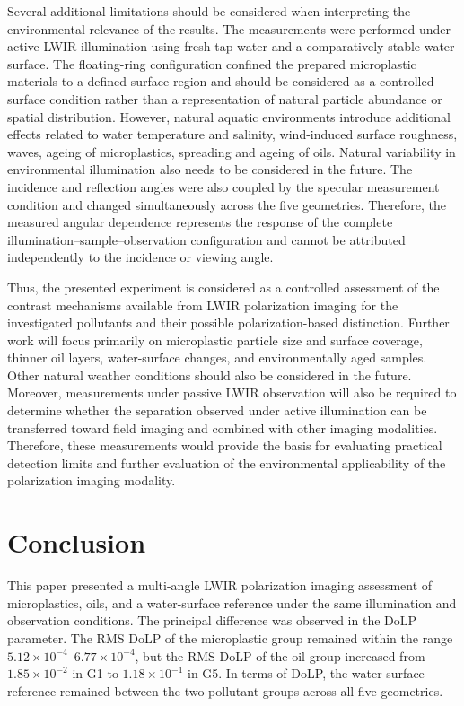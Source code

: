 \documentclass[pdflatex,sn-apa]{sn-jnl}
\begin{document}
Several additional limitations should be considered when interpreting the environmental relevance of the results. The measurements were performed under active LWIR illumination using fresh tap water and a comparatively stable water surface. The floating-ring configuration confined the prepared microplastic materials to a defined surface region and should be considered as a controlled surface condition rather than a representation of natural particle abundance or spatial distribution. However, natural aquatic environments introduce additional effects related to water temperature and salinity, wind-induced surface roughness, waves, ageing of microplastics, spreading and ageing of oils. Natural variability in environmental illumination also needs to be considered in the future. The incidence and reflection angles were also coupled by the specular measurement condition and changed simultaneously across the five geometries. Therefore, the measured angular dependence represents the response of the complete illumination--sample--observation configuration and cannot be attributed independently to the incidence or viewing angle.

Thus, the presented experiment is considered as a controlled assessment of the contrast mechanisms available from LWIR polarization imaging for the investigated pollutants and their possible polarization-based distinction. Further work will focus primarily on microplastic particle size and surface coverage, thinner oil layers, water-surface changes, and environmentally aged samples. Other natural weather conditions should also be considered in the future. Moreover, measurements under passive LWIR observation will also be required to determine whether the separation observed under active illumination can be transferred toward field imaging and combined with other imaging modalities. Therefore, these measurements would provide the basis for evaluating practical detection limits and further evaluation of the environmental applicability of the polarization imaging modality.

\section{Conclusion}

This paper presented a multi-angle LWIR polarization imaging assessment of microplastics, oils, and a water-surface reference under the same illumination and observation conditions. The principal difference was observed in the DoLP parameter. The RMS DoLP of the microplastic group remained within the range $5.12\times10^{-4}$--$6.77\times10^{-4}$, but the RMS DoLP of the oil group increased from $1.85\times10^{-2}$ in G1 to $1.18\times10^{-1}$ in G5. In terms of DoLP, the water-surface reference remained between the two pollutant groups across all five geometries.
\end{document}
